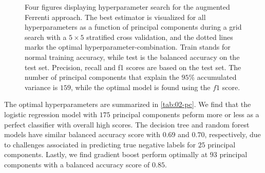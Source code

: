 \begin{figure}[ht!]
  \begin{subfigure}[b]{1.0\textwidth}
    \centering
    
  \end{subfigure}
\par\bigskip
  \begin{subfigure}[b]{0.5\textwidth}
    
    \caption{}
    \label{fig:q2-LOG}
  \end{subfigure}%
  \hfill
  \begin{subfigure}[b]{0.5\textwidth}
    
    \caption{}
    \label{fig:q2-DT}
  \end{subfigure}

  \begin{subfigure}[b]{0.5\textwidth}
    
    \caption{}
    \label{fig:q2-RF}
  \end{subfigure}%
  \hfill
  \begin{subfigure}[b]{0.5\textwidth}
    
    \caption{}
    \label{fig:q2-GB}
  \end{subfigure}
  \vspace*{-130mm}
  \caption{{Four figures displaying hyperparameter search for the augmented Ferrenti approach. The best estimator is visualized for all hyperparameters as a function of principal components during a grid search with a $5\times5$ stratified cross validation, and the dotted lines marks the optimal hyperparameter-combination. Train stands for normal training accuracy, while test is the balanced accuracy on the test set. Precision, recall and f1 scores are based on the test set. The number of principal components that explain the $95\%$ accumulated variance is $159$, while the optimal model is found using the $f1$ score.}}
  \label{fig:02-pca}
\end{figure}

The optimal hyperparameters are summarized in \autoref{tab:02-pc}. We find that the logistic regression model with $175$ principal components peform more or less as a perfect classifier with overall high scores. The decision tree and random forest models have similar balanced accuracy score with $0.69$ and $0.70$, respectively, due to challenges associated in predicting true negative labels for $25$ principal components. Lastly, we find gradient boost perform optimally at $93$ principal components with a balanced accuracy score of $0.85$.

